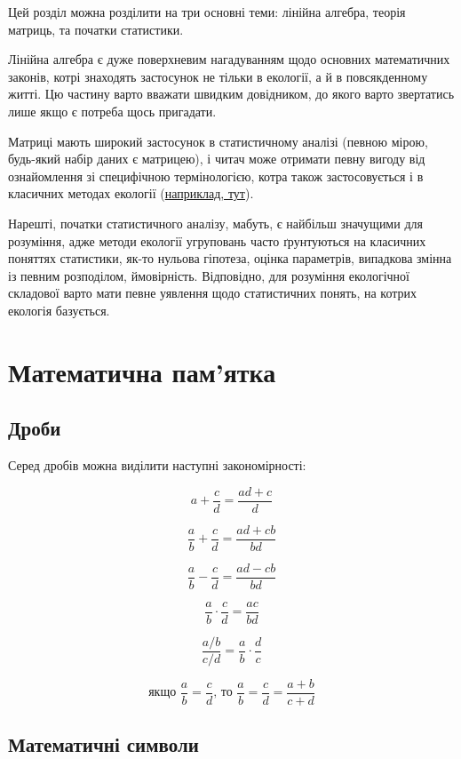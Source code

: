 \documentclass[
  11pt,
]{book}
\begin{document}
Цей розділ можна розділити на три основні теми: лінійна алгебра, теорія
матриць, та початки статистики.

Лінійна алгебра є дуже поверхневим нагадуванням щодо основних
математичних законів, котрі знаходять застосунок не тільки в екології, а
й в повсякденному житті. Цю частину варто вважати швидким довідником, до
якого варто звертатись лише якщо є потреба щось пригадати.

Матриці мають широкий застосунок в статистичному аналізі (певною мірою,
будь-який набір даних є матрицею), і читач може отримати певну вигоду
від ознайомлення зі специфічною термінологією, котра також
застосовується і в класичних методах екології
(\hyperref[Leslie-matrix]{наприклад, тут}).

Нарешті, початки статистичного аналізу, мабуть, є найбільш значущими для
розуміння, адже методи екології угруповань часто ґрунтуються на
класичних поняттях статистики, як-то нульова гіпотеза, оцінка
параметрів, випадкова змінна із певним розподілом, ймовірність.
Відповідно, для розуміння екологічної складової варто мати певне
уявлення щодо статистичних понять, на котрих екологія базується.

\section{Математична пам'ятка}\label{algebra}

\subsection{Дроби}\label{ux434ux440ux43eux431ux438}

Серед дробів можна виділити наступні закономірності:

\[a+\frac{c}{d} = \frac{ad+c}{d}\]

\[\frac{a}{b}+\frac{c}{d} = \frac{ad+cb}{bd}\]

\[\frac{a}{b} - \frac{c}{d} = \frac{ad-cb}{bd}\]

\[\frac{a}{b} \cdot \frac{c}{d} = \frac{ac}{bd}\]

\[\frac{a/b}{c/d} = \frac{a}{b} \cdot \frac{d}{c}\]

\[\text{якщо } \frac{a}{b} = \frac{c}{d} \text{, то } \frac{a}{b} = \frac{c}{d} = \frac{a+b}{c+d}\]

\subsection{Математичні
символи}\label{ux43cux430ux442ux435ux43cux430ux442ux438ux447ux43dux456-ux441ux438ux43cux432ux43eux43bux438}
\end{document}
